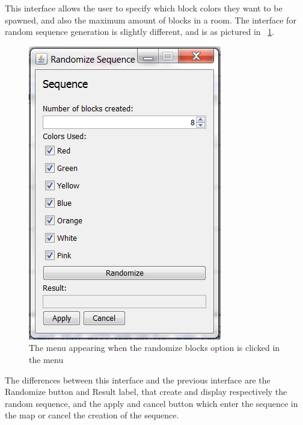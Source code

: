 This interface allows the user to specify which block colors they want to be spawned, and also the maximum amount of blocks in a room. The interface for random sequence generation is slightly different, and is as pictured in ~\ref{fig:menuSeq}.
\begin{figure}[h]
	\includegraphics[scale=0.6]{NewFeatures/MenuSeq.png}
\caption{The menu appearing when the randomize blocks option is clicked in the menu}
\label{fig:menuSeq}
\end{figure}
The differences between this interface and the previous interface are the Randomize button and Result label, that create and display respectively the random sequence, and the apply and cancel button which enter the sequence in the map or cancel the creation of the sequence.